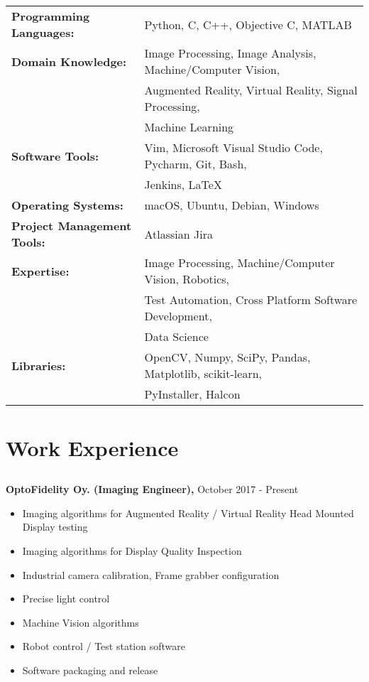 \documentclass{article}
\begin{document}
\subsection{}
\begin{tabular}{l l}
  \textbf{Programming Languages:} & Python, C, C++, Objective C, MATLAB \\ [2pt]
  \textbf{Domain Knowledge:} & Image Processing, Image Analysis, Machine/Computer Vision, \\ 
                             & Augmented Reality, Virtual Reality, Signal Processing, \\
                             & Machine Learning \\ [2pt]
  \textbf{Software Tools:} & Vim, Microsoft Visual Studio Code, Pycharm, Git, Bash, \\
                           & Jenkins, LaTeX \\ [2pt]
  \textbf{Operating Systems:} & macOS, Ubuntu, Debian, Windows \\ [2pt]
  \textbf{Project Management Tools:} & Atlassian Jira \\ [2pt]
  \textbf{Expertise:} & Image Processing, Machine/Computer Vision, Robotics, \\
                      & Test Automation, Cross Platform Software Development, \\ 
                      & Data Science \\ [2pt]
  \textbf{Libraries:} & OpenCV, Numpy, SciPy, Pandas, Matplotlib, scikit-learn, \\
                      & PyInstaller, Halcon \\
\end{tabular}
\subsection{}

\section{Work Experience}
\subsection{}
\textbf{OptoFidelity Oy. (Imaging Engineer),} October 2017 - Present
\begin{itemize}[leftmargin=0.75in]
  \item Imaging algorithms for Augmented Reality / Virtual Reality Head Mounted Display testing
  \item Imaging algorithms for Display Quality Inspection
  \item Industrial camera calibration, Frame grabber configuration
  \item Precise light control
  \item Machine Vision algorithms
  \item Robot control / Test station software
  \item Software packaging and release
\end{itemize}
\end{document}
